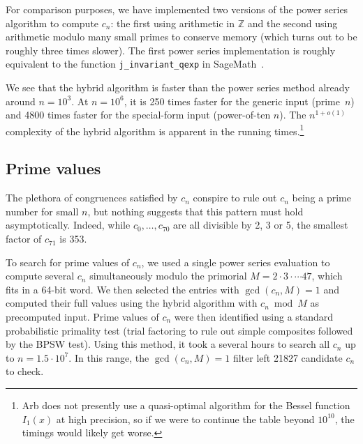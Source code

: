 \documentclass{amsart}
\theoremstyle{definition}
\theoremstyle{remark}
\begin{document}
For comparison purposes, we have implemented two versions of
the power series algorithm to compute $c_n$: the first
using arithmetic in $\mathbb{Z}$ and the second
using arithmetic modulo many small primes to conserve memory
(which turns out to be roughly three times slower).
The first power series implementation
is roughly equivalent to the function \texttt{j\_invariant\_qexp}
in SageMath~\cite{Sag2020}.

We see that the hybrid algorithm is faster
than the power series method already around $n = 10^3$.
At $n = 10^6$, it is 250 times faster for the generic input
(prime~$n$) and 4800 times faster
for the special-form input (power-of-ten $n$).
The $n^{1+o(1)}$ complexity of the hybrid
algorithm is apparent in the running times.\footnote{Arb does not presently
use a quasi-optimal algorithm for the Bessel function $I_1(x)$ at high precision,
so if we were to continue the table beyond $10^{10}$,
the timings would likely get worse.}

\subsection{Prime values}

The plethora of congruences satisfied by $c_n$
conspire to rule out $c_n$ being a prime number for small $n$,
but nothing suggests that this pattern must hold
asymptotically.
Indeed, while $c_0,\ldots,c_{70}$ are all
divisible by 2, 3 or 5, the smallest factor of $c_{71}$ is 353.

To search for prime values of $c_n$, we used a single power series
evaluation
to compute several $c_n$ simultaneously modulo the primorial
$M = 2 \cdot 3 \cdot \cdots 47$, which fits in a 64-bit word.
We then selected the entries with $\gcd(c_n, M) = 1$
and computed their full values 
using the hybrid algorithm with $c_n \bmod M$ as precomputed input.
Prime values of $c_n$ were then identified using a standard probabilistic
primality test (trial factoring to rule out simple composites
followed by the BPSW test).
Using this method, it took a several hours to search all $c_n$ up to $n = 1.5 \cdot 10^7$.
In this range, the $\gcd(c_n, M) = 1$ filter left 21827 candidate $c_n$ to check.
\end{document}
